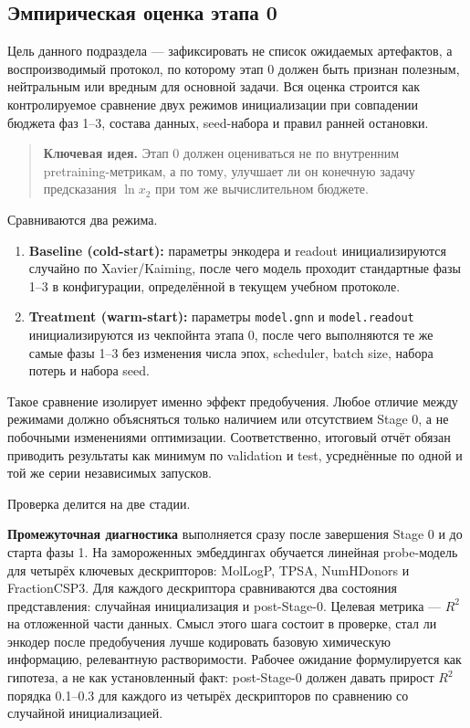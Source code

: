 \documentclass[11pt]{article}
\newcommand{\keyidea}[1]{\begin{quote}\textbf{Ключевая идея.} #1\end{quote}}
\begin{document}
\subsection{Эмпирическая оценка этапа 0}

Цель данного подраздела --- зафиксировать не список ожидаемых артефактов, а воспроизводимый протокол, по которому этап 0 должен быть признан полезным, нейтральным или вредным для основной задачи. Вся оценка строится как контролируемое сравнение двух режимов инициализации при совпадении бюджета фаз 1--3, состава данных, seed-набора и правил ранней остановки.

\keyidea{Этап 0 должен оцениваться не по внутренним pretraining-метрикам, а по тому, улучшает ли он конечную задачу предсказания $\ln x_2$ при том же вычислительном бюджете.}

Сравниваются два режима.
\begin{enumerate}
  \item \textbf{Baseline (cold-start):} параметры энкодера и readout инициализируются случайно по Xavier/Kaiming, после чего модель проходит стандартные фазы 1--3 в конфигурации, определённой в текущем учебном протоколе.
  \item \textbf{Treatment (warm-start):} параметры \texttt{model.gnn} и \texttt{model.readout} инициализируются из чекпойнта этапа 0, после чего выполняются те же самые фазы 1--3 без изменения числа эпох, scheduler, batch size, набора потерь и набора seed.
\end{enumerate}

Такое сравнение изолирует именно эффект предобучения. Любое отличие между режимами должно объясняться только наличием или отсутствием Stage 0, а не побочными изменениями оптимизации. Соответственно, итоговый отчёт обязан приводить результаты как минимум по validation и test, усреднённые по одной и той же серии независимых запусков.

Проверка делится на две стадии.

\textbf{Промежуточная диагностика} выполняется сразу после завершения Stage 0 и до старта фазы 1. На замороженных эмбеддингах обучается линейная probe-модель для четырёх ключевых дескрипторов: MolLogP, TPSA, NumHDonors и FractionCSP3. Для каждого дескриптора сравниваются два состояния представления: случайная инициализация и post-Stage-0. Целевая метрика --- $R^2$ на отложенной части данных. Смысл этого шага состоит в проверке, стал ли энкодер после предобучения лучше кодировать базовую химическую информацию, релевантную растворимости. Рабочее ожидание формулируется как гипотеза, а не как установленный факт: post-Stage-0 должен давать прирост $R^2$ порядка 0.1--0.3 для каждого из четырёх дескрипторов по сравнению со случайной инициализацией.
\end{document}
